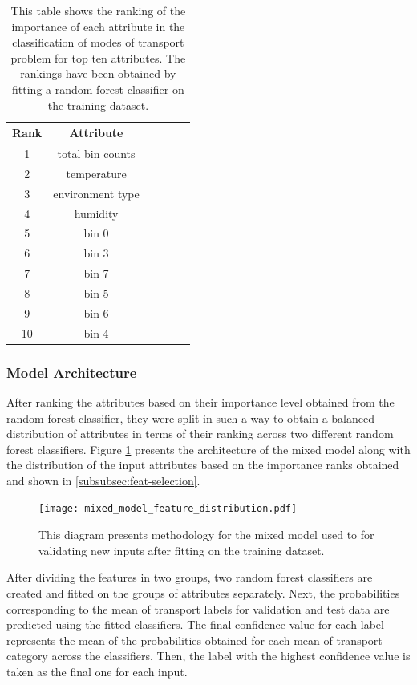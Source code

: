 \documentclass[bsc,frontabs,twoside,singlespacing, parskip,deptreport]{infthesis}     %
\begin{document}
\begin{table}[h!]
\centering
 \begin{tabular}{||c | c | c | c | c | c||} 
 \hline
 Rank & Attribute \\ [0.5ex] 
 \hline\hline
 1 & total bin counts \\ 
 \hline
 2 &  temperature \\
 \hline
 3 &  environment type \\
  \hline
 4 &  humidity \\
  \hline
 5 &  bin 0 \\
  \hline
 6 &  bin 3 \\
  \hline
 7 &  bin 7 \\
 \hline
 8 & bin 5 \\
  \hline
 9 &  bin 6 \\ 
  \hline
 10 &  bin 4 \\
 \hline
\end{tabular}
\caption{This table shows the ranking of the importance of each attribute in the classification of modes of transport problem for top ten attributes. The rankings have been obtained by fitting a random forest classifier on the training dataset.}
\label{table:attr-rank}
\end{table}


\subsubsection{Model Architecture}

After ranking the attributes based on their importance level obtained from the random forest classifier, they were split in such a way to obtain a balanced distribution of attributes in terms of their ranking across two different random forest classifiers. Figure \ref{fig:mixed_model_feature_distribution} presents the architecture of the mixed model along with the distribution of the input attributes based on the importance ranks obtained and shown in \ref{subsubsec:feat-selection}.

\begin{figure}[h!]
  \center
  \texttt{[image: mixed\_model\_feature\_distribution.pdf]}
  \caption{This diagram presents methodology for the mixed model used to for validating new inputs after fitting on the training dataset.}
  \label{fig:mixed_model_feature_distribution}
\end{figure}

After dividing the features in two groups, two random forest classifiers are created and fitted on the groups of attributes separately. Next, the probabilities corresponding to the mean of transport labels for validation and test data are predicted using the fitted classifiers. The final confidence value for each label represents the mean of the probabilities obtained for each mean of transport category across the classifiers. Then, the label with the highest confidence value is taken as the final one for each input.
\end{document}
